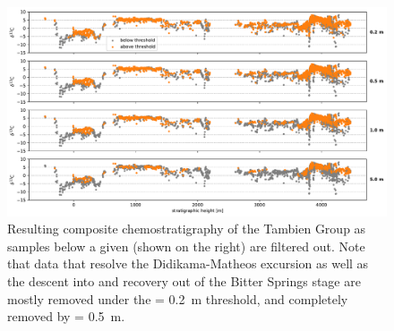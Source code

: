 \begin{figure}[h!]
\begin{center}
	\includegraphics[width=\textwidth]{figures/Tambien/siliciclastic-filtering-comparison.pdf}
	\caption{Resulting composite chemostratigraphy of the Tambien Group as samples below a given \dsil (shown on the right) are filtered out. Note that data that resolve the Didikama-Matheos excursion as well as the descent into and recovery out of the Bitter Springs stage are mostly removed under the \dsil = 0.2~m threshold, and completely removed by \dsil = 0.5~m.}
	\label{fig:siliciclastic-filtering-comparison}
\end{center}
\end{figure}

